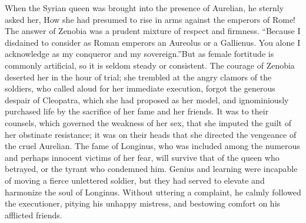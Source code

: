 

When the Syrian queen was brought into the presence of Aurelian,
he sternly asked her, How she had presumed to rise in arms
against the emperors of Rome! The answer of Zenobia was a prudent
mixture of respect and firmness. “Because I disdained to consider
as Roman emperors an Aureolus or a Gallienus. You alone I
acknowledge as my conqueror and my sovereign.”\footnotemark[73] But as female
fortitude is commonly artificial, so it is seldom steady or
consistent. The courage of Zenobia deserted her in the hour of
trial; she trembled at the angry clamors of the soldiers, who
called aloud for her immediate execution, forgot the generous
despair of Cleopatra, which she had proposed as her model, and
ignominiously purchased life by the sacrifice of her fame and her
friends. It was to their counsels, which governed the weakness of
her sex, that she imputed the guilt of her obstinate resistance;
it was on their heads that she directed the vengeance of the
cruel Aurelian. The fame of Longinus, who was included among the
numerous and perhaps innocent victims of her fear, will survive
that of the queen who betrayed, or the tyrant who condemned him.
Genius and learning were incapable of moving a fierce unlettered
soldier, but they had served to elevate and harmonize the soul of
Longinus. Without uttering a complaint, he calmly followed the
executioner, pitying his unhappy mistress, and bestowing comfort
on his afflicted friends.\footnotemark[74]



